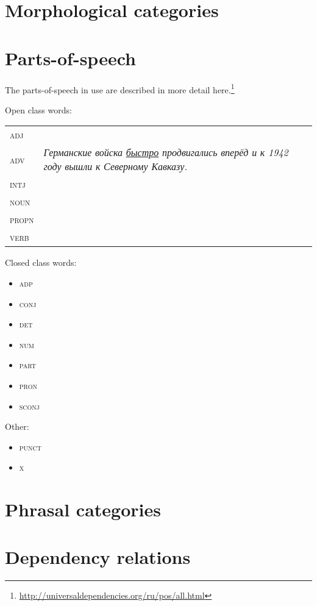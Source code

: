 \documentclass[a4paper,11pt, onecolumn,twoside]{article}
\newcommand{\gmk}[1]{{\rm {\ll \textsc{#1}}}}
\begin{document}
\section{Morphological categories}

\section{Parts-of-speech}

The parts-of-speech in use are described in more detail here.\footnote{\url{http://universaldependencies.org/ru/pos/all.html}}

Open class words:

\begin{tabular}{ll}
   \gmk{adj} &    \\
   \gmk{adv} & \emph{Германские войска \underline{быстро} продвигались вперёд и к 1942 году вышли к Северному Кавказу.}  \\
   \gmk{intj} &  \\
   \gmk{noun} &  \\
   \gmk{propn} &  \\
   \gmk{verb} &  \\
\end{tabular}

Closed class words:

\begin{itemize}
   \item \gmk{adp}
   \item \gmk{conj}
   \item \gmk{det}
   \item \gmk{num}
   \item \gmk{part}
   \item \gmk{pron}
   \item \gmk{sconj}
\end{itemize}

Other:

\begin{itemize}
   \item \gmk{punct}
   \item \gmk{x}
\end{itemize}

\section{Phrasal categories}

\section{Dependency relations}
\end{document}
